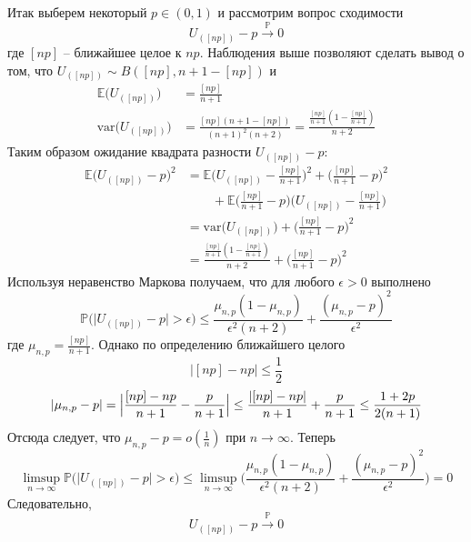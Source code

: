 \documentclass[a4paper]{article}
\newcommand{\ex}[0]{{\mathbb{E}}}
\newcommand{\pr}[0]{{\mathbb{P}}}
\newcommand{\var}[0]{\text{var}}
\begin{document}
Итак выберем некоторый $p\in (0,1)$ и рассмотрим вопрос сходимости
\[U_{([np])} - p \overset{\pr}{\to} 0\]
где $[np]$ -- ближайшее целое к $np$. Наблюдения выше позволяют сделать вывод о том,
что $U_{([np])}\sim B([np], n+1-[np])$ и
\begin{align*}
	\ex\bigl(U_{([np])}\bigr)
		&= \frac{[np]}{n+1}\\
	\var\bigl(U_{([np])}\bigr)
		&= \frac{[np](n+1-[np])}{(n+1)^2(n+2)}
		= \frac{\frac{[np]}{n+1}(1-\frac{[np]}{n+1})}{n+2}
\end{align*}
Таким образом ожидание квадрата разности $U_{([np])} - p$:
\begin{align*}
	\ex\bigl(U_{([np])} - p\bigr)^2
	&= \ex\bigl(U_{([np])} - \frac{[np]}{n+1}\bigr)^2 + \bigl(\frac{[np]}{n+1}-p\bigr)^2 \\
	&\quad\quad + \ex\bigl(\frac{[np]}{n+1}-p\bigr)\bigl(U_{([np])} - \frac{[np]}{n+1}\bigr)\\
	&= \var\bigl(U_{([np])}\bigr) + \bigl(\frac{[np]}{n+1}-p\bigr)^2 \\
	&= \frac{\frac{[np]}{n+1}(1-\frac{[np]}{n+1})}{n+2} + \bigl(\frac{[np]}{n+1}-p\bigr)^2
\end{align*}
Используя неравенство Маркова получаем, что для любого $\epsilon>0$ выполнено
\[
\pr\bigl( \lvert U_{([np])} - p\rvert > \epsilon \bigr)
\leq \frac{\mu_{n,p}(1-\mu_{n,p})}{\epsilon^2(n+2)} + \frac{(\mu_{n,p}-p)^2}{\epsilon^2}
\]
где $\mu_{n,p} = \frac{[np]}{n+1}$. Однако по определению ближайшего целого
\[\bigl\lvert[np]-np\bigr\rvert \leq \frac{1}{2}\]
\[
\lvert \mu_{n,p}-p \rvert
= \Bigl\lvert \frac{[np]-np}{n+1}-\frac{p}{n+1} \Bigr\rvert
\leq \frac{\lvert[np]-np\rvert}{n+1}+\frac{p}{n+1}
\leq \frac{1+2p}{2(n+1)}
\]
Отсюда следует, что $\mu_{n,p} - p = o(\frac{1}{n})$ при $n\to\infty$. Теперь
\[
\limsup_{n\to \infty} \pr\bigl( \lvert U_{([np])} - p\rvert > \epsilon \bigr)
\leq \limsup_{n\to \infty} \bigl(\frac{\mu_{n,p}(1-\mu_{n,p})}{\epsilon^2(n+2)}
	+ \frac{(\mu_{n,p}-p)^2}{\epsilon^2}\bigr)
= 0
\]
Следовательно,
\[U_{([np])} - p \overset{\pr}{\to} 0\]
\end{document}
